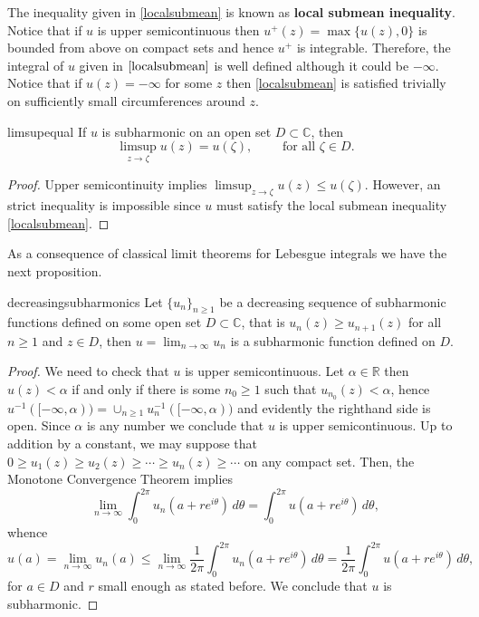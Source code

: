 The inequality given in \eqref{localsubmean} is known as {\bf local submean inequality}. Notice that if $u$ is upper semicontinuous then $u^+(z)=\max\{u(z),0\}$ is bounded from above on compact sets and hence $u^+$ is integrable. Therefore, the integral of $u$ given in $\eqref{localsubmean}$ is well defined although it could be $-\infty$. Notice that if $u(z)=-\infty$ for some $z$ then \eqref{localsubmean} is satisfied trivially on sufficiently small circumferences around $z$.\\

\begin{myprop}{}{limsupequal}
If $u$ is subharmonic on an open set $D\subset \mathbb{C}$, then
$$\limsup_{z\rightarrow \zeta} u(z) =u(\zeta), \qquad \text{ for all } \zeta\in D.$$
\end{myprop}

\begin{proof}
Upper semicontinuity implies $\limsup_{z\rightarrow \zeta} u(z) \leq u(\zeta)$. However, an strict inequality is impossible since $u$ must satisfy the local submean inequality \eqref{localsubmean}.
\end{proof}

As a consequence of classical limit theorems for Lebesgue integrals we have the next proposition.

\begin{myprop}{}{decreasingsubharmonics}
Let $\{u_n\}_{n\geq 1}$ be a decreasing sequence of subharmonic functions defined on some open set $D\subset \mathbb{C}$, that is $u_n(z)\geq u_{n+1}(z)$ for all $n\geq 1$ and $z\in D$, then $u=\lim_{n\rightarrow \infty}u_n$ is a subharmonic function defined on $D$.
\end{myprop}

\begin{proof}
We need to check that $u$ is upper semicontinuous. Let $\alpha\in \mathbb{R}$ then $u(z)<\alpha$ if and only if there is some $n_0\geq 1$ such that $u_{n_0}(z)<\alpha$, hence $u^{-1}([-\infty,\alpha)) = \cup_{n\geq 1} u_n^{-1}([-\infty,\alpha))$ and evidently the righthand side is open. Since $\alpha$ is any number we conclude that $u$ is upper semicontinuous. Up to addition by a constant, we may suppose that $0 \geq u_1(z) \geq u_2(z) \geq \cdots \geq u_n(z) \geq \cdots$ on any compact set. Then, the Monotone Convergence Theorem implies
$$\lim_{n\rightarrow \infty}\int_0^{2\pi} u_n(a+re^{i\theta})\,d\theta = \int_0^{2\pi} u(a+re^{i\theta})\,d\theta,$$
whence
$$u(a) =\lim_{n\rightarrow \infty}u_n(a) \leq \lim_{n\rightarrow \infty} \frac{1}{2\pi} \int_0^{2\pi} u_n(a+re^{i\theta})\,d\theta = \frac{1}{2\pi} \int_0^{2\pi} u(a+re^{i\theta})\,d\theta,$$ 
for $a\in D$ and $r$ small enough as stated before. We conclude that $u$ is subharmonic.
\end{proof}

